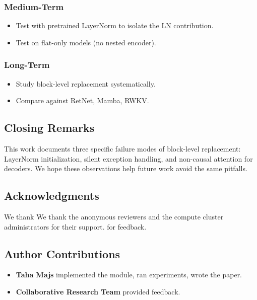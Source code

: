 \subsubsection{Medium-Term}

\begin{itemize}
\item Test with pretrained LayerNorm to isolate the LN contribution.
\item Test on flat-only models (no nested encoder).

\end{itemize}
\subsubsection{Long-Term}

\begin{itemize}
\item Study block-level replacement systematically.
\item Compare against RetNet, Mamba, RWKV.

\end{itemize}
\subsection{Closing Remarks}

This work documents three specific failure modes of block-level replacement:
LayerNorm initialization, silent exception handling, and non-causal attention 
for decoders. We hope these observations help future work avoid the same 
pitfalls.

\subsection{Acknowledgments}

We thank We thank the anonymous reviewers and the compute cluster administrators for their support. for feedback.

\subsection{Author Contributions}

\begin{itemize}
\item \textbf{Taha Majs} implemented the module, ran experiments, wrote the paper.
\item \textbf{Collaborative Research Team} provided feedback.

\end{itemize}
